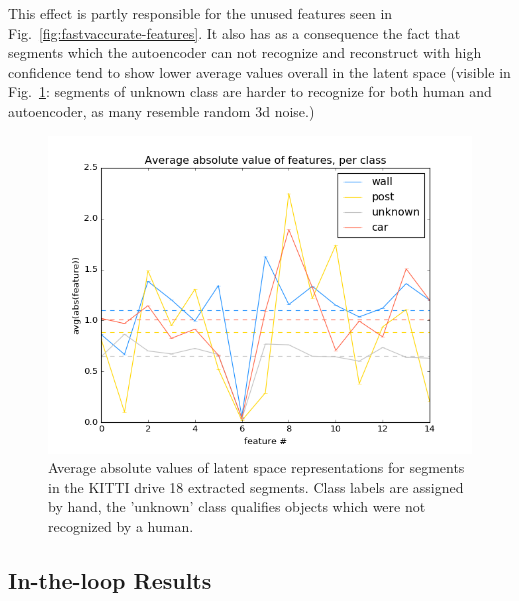 This effect is partly responsible for the unused features seen in Fig.~\ref{fig:fastvaccurate-features}. It also has as a consequence the fact that segments which the autoencoder can not recognize and reconstruct with high confidence tend to show lower average values overall in the latent space (visible in Fig.~\ref{fig:avg-abs-features}: segments of unknown class are harder to recognize for both human and autoencoder, as many resemble random 3d noise.)

\begin{figure}
  \centering
  \includegraphics[width=5.2in]{images/avg_abs_features.png}
  \caption{Average absolute values of latent space representations for segments in the KITTI drive 18 extracted segments. Class labels are assigned by hand, the 'unknown' class qualifies objects which were not recognized by a human.}
  \label{fig:avg-abs-features}
\end{figure}

\subsection{In-the-loop Results}

